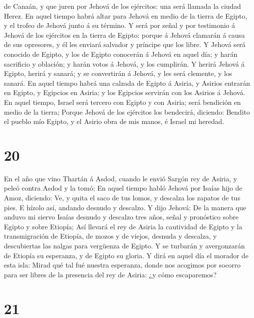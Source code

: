 de Canaán, y que juren por Jehová de los ejércitos: una será llamada la
ciudad Herez.  En aquel tiempo habrá altar para Jehová en
medio de la tierra de Egipto, y el trofeo de Jehová junto á su término.
 Y será por señal y por testimonio á Jehová de los
ejércitos en la tierra de Egipto: porque á Jehová clamarán á causa de
sus opresores, y él les enviará salvador y príncipe que los libre.
 Y Jehová será conocido de Egipto, y los de Egipto
conocerán á Jehová en aquel día; y harán sacrificio y oblación; y harán
votos á Jehová, y los cumplirán.  Y herirá Jehová á
Egipto, herirá y sanará; y se convertirán á Jehová, y les será clemente,
y los sanará.  En aquel tiempo habrá una calzada de
Egipto á Asiria, y Asirios entrarán en Egipto, y Egipcios en Asiria; y
los Egipcios servirán con los Asirios á Jehová.  En aquel
tiempo, Israel será tercero con Egipto y con Asiria; será bendición en
medio de la tierra;  Porque Jehová de los ejércitos los
bendecirá, diciendo: Bendito el pueblo mío Egipto, y el Asirio obra de
mis manos, é Israel mi heredad.

\hypertarget{section-19}{%
\section{20}\label{section-19}}

 En el año que vino Thartán á Asdod, cuando le envió
Sargón rey de Asiria, y peleó contra Asdod y la tomó;  En
aquel tiempo habló Jehová por Isaías hijo de Amoz, diciendo: Ve, y quita
el saco de tus lomos, y descalza los zapatos de tus pies. E hízolo así,
andando desnudo y descalzo.  Y dijo Jehová: De la manera
que anduvo mi siervo Isaías desnudo y descalzo tres años, señal y
pronóstico sobre Egipto y sobre Etiopía;  Así llevará el
rey de Asiria la cautividad de Egipto y la transmigración de Etiopía, de
mozos y de viejos, desnuda y descalza, y descubiertas las nalgas para
vergüenza de Egipto.  Y se turbarán y avergonzarán de
Etiopía su esperanza, y de Egipto su gloria.  Y dirá en
aquel día el morador de esta isla: Mirad qué tal fué nuestra esperanza,
donde nos acogimos por socorro para ser libres de la presencia del rey
de Asiria: ¿y cómo escaparemos?

\hypertarget{section-20}{%
\section{21}\label{section-20}}

